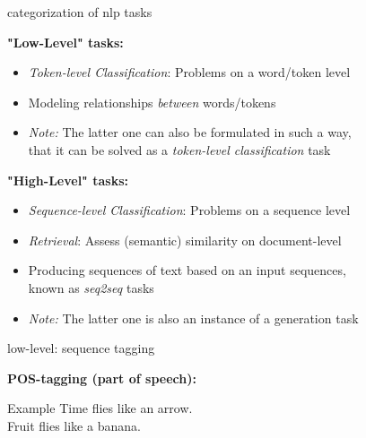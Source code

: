 \begin{vbframe}{categorization of nlp tasks}

\vfill

\textbf{"Low-Level" tasks:}

	\begin{itemize}
		\item \textit{Token-level Classification}: Problems on a word/token level
		\item Modeling relationships \textit{between} words/tokens %
		\item \textit{Note:} The latter one can also be formulated in such a way,\\that it can be solved as a \textit{token-level classification} task
	\end{itemize}
	
\vspace{.3cm}

\textbf{"High-Level" tasks:}

	\begin{itemize}
		\item \textit{Sequence-level Classification}: Problems on a sequence level
		\item \textit{Retrieval}: Assess (semantic) similarity on document-level
		\item Producing sequences of text based on an input sequences,\\known as \textit{seq2seq} tasks
		\item \textit{Note:} The latter one is also an instance of a generation task
	\end{itemize}

\vfill

\end{vbframe}


\begin{frame}{low-level: sequence tagging}

\vspace{1cm}

\textbf{POS-tagging (part of speech):}

\begin{exampleblock}{Example}
	Time flies   like   an   arrow.\\Fruit   flies   like   a   banana.
\end{exampleblock}

\vfill

\end{frame}

